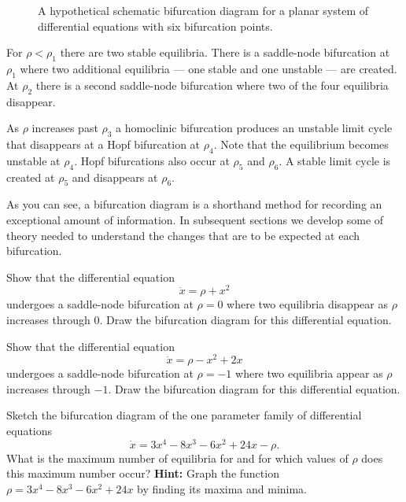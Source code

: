 \documentclass{ximera}
\begin{document}
\begin{figure}[htb]
           \centerline{%
           }
  	   \caption{A hypothetical schematic bifurcation diagram for a planar 
	  system of differential equations with six bifurcation points.} 
           \label{F:hypo}
\end{figure}

For $\rho<\rho_1$
there are two stable equilibria.  There is a saddle-node bifurcation 
at $\rho_1$ where two additional equilibria --- one stable and one 
unstable --- are created.  At $\rho_2$ there is a second saddle-node 
bifurcation where two of the four equilibria disappear.  

As $\rho$ increases past $\rho_3$ a homoclinic 
bifurcation produces an
unstable limit cycle that disappears at a 
Hopf bifurcation at $\rho_4$.  
Note that the equilibrium becomes unstable at $\rho_4$.
Hopf bifurcations also occur at $\rho_5$ and $\rho_6$.   A stable
limit cycle is created at $\rho_5$ and disappears at $\rho_6$.

As you can see, a  bifurcation diagram is a shorthand method for recording
an exceptional amount of information.  In subsequent sections we develop 
some of theory needed to understand the changes that are to be expected 
at each bifurcation.  

\EXER

\TEXER

\begin{exercise} \label{c9.7.1}
Show that the differential equation 
\[
\dot{x} = \rho + x^2
\]
undergoes a saddle-node bifurcation at $\rho=0$ where two equilibria 
disappear as $\rho$ increases through $0$.  Draw the bifurcation diagram 
for this differential equation.
\end{exercise}

\begin{exercise} \label{c9.7.2}
Show that the differential equation
\[
\dot{x} = \rho - x^2 + 2x
\]
undergoes a saddle-node bifurcation at $\rho=-1$ where two equilibria
appear as $\rho$ increases through $-1$.  Draw the bifurcation diagram
for this differential equation.
\end{exercise}

\begin{exercise} \label{c9.7.3}
Sketch the bifurcation diagram of the one parameter family of differential 
equations
\begin{equation} \label{E:ex2}
\dot{x} = 3x^4 - 8x^3 - 6x^2 + 24x - \rho.
\end{equation}
What is the maximum number of equilibria for  and for which 
values of $\rho$ does this maximum number occur? {\bf Hint:} Graph the 
function $\rho=3x^4 - 8x^3 - 6x^2 + 24x$ by finding its maxima and minima. 
\end{exercise}
\end{document}
